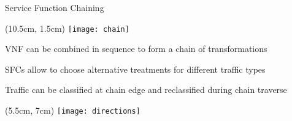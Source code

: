 \begin{frame}{Service Function Chaining}

  \begin{textblock*}{1cm}(10.5cm, 1.5cm)
    \texttt{[image: chain]}
  \end{textblock*}

  VNF can be combined in sequence to form a chain of transformations

  \vspace{0.7cm}

  SFCs allow to choose alternative treatments for different traffic types

  \vspace{0.7cm}

  Traffic can be classified at chain edge and reclassified during chain traverse

  \begin{textblock*}{1cm}(5.5cm, 7cm)
    \texttt{[image: directions]}
  \end{textblock*}

\end{frame}